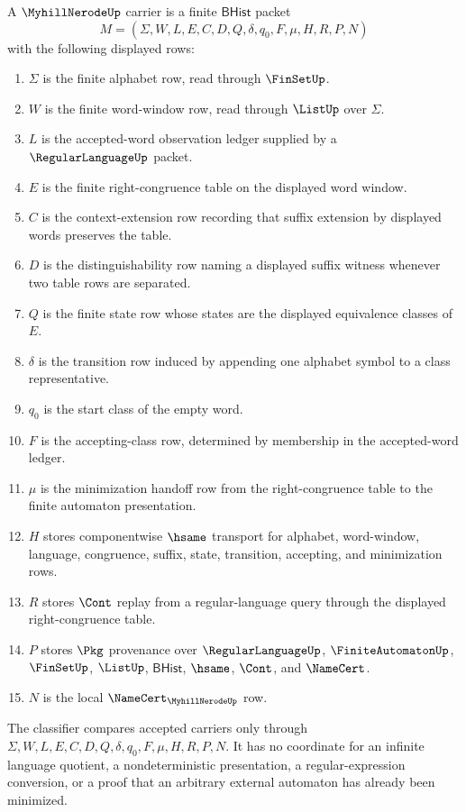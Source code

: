 \begin{definition}
\label{def:myhill-nerode-carrier}
A $\MyhillNerodeUp$ carrier is a finite $\mathsf{BHist}$ packet
$$
M=(\Sigma,W,L,E,C,D,Q,\delta,q_0,F,\mu,H,R,P,N)
$$
with the following displayed rows:
\begin{enumerate}
\item $\Sigma$ is the finite alphabet row, read through $\FinSetUp$.
\item $W$ is the finite word-window row, read through $\ListUp$ over $\Sigma$.
\item $L$ is the accepted-word observation ledger supplied by a $\RegularLanguageUp$ packet.
\item $E$ is the finite right-congruence table on the displayed word window.
\item $C$ is the context-extension row recording that suffix extension by displayed words preserves the table.
\item $D$ is the distinguishability row naming a displayed suffix witness whenever two table rows are separated.
\item $Q$ is the finite state row whose states are the displayed equivalence classes of $E$.
\item $\delta$ is the transition row induced by appending one alphabet symbol to a class representative.
\item $q_0$ is the start class of the empty word.
\item $F$ is the accepting-class row, determined by membership in the accepted-word ledger.
\item $\mu$ is the minimization handoff row from the right-congruence table to the finite automaton presentation.
\item $H$ stores componentwise $\hsame$ transport for alphabet, word-window, language, congruence, suffix, state, transition, accepting, and minimization rows.
\item $R$ stores $\Cont$ replay from a regular-language query through the displayed right-congruence table.
\item $P$ stores $\Pkg$ provenance over $\RegularLanguageUp$, $\FiniteAutomatonUp$, $\FinSetUp$, $\ListUp$, $\mathsf{BHist}$, $\hsame$, $\Cont$, and $\NameCert$.
\item $N$ is the local $\NameCert_{\MyhillNerodeUp}$ row.
\end{enumerate}
The classifier compares accepted carriers only through $\Sigma,W,L,E,C,D,Q,\delta,q_0,F,\mu,H,R,P,N$. It has no coordinate for an infinite language quotient, a nondeterministic presentation, a regular-expression conversion, or a proof that an arbitrary external automaton has already been minimized.
\end{definition}

